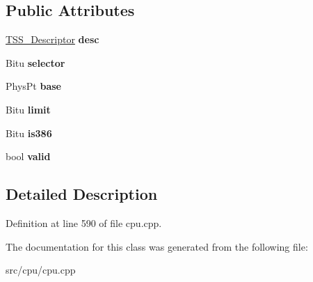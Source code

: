 \subsection*{Public Attributes}
\begin{DoxyCompactItemize}
\item 
\hypertarget{classTaskStateSegment_a46267346746acbf867d029fd39f902e3}{\hyperlink{classTSS__Descriptor}{T\-S\-S\-\_\-\-Descriptor} {\bfseries desc}}\label{classTaskStateSegment_a46267346746acbf867d029fd39f902e3}

\item 
\hypertarget{classTaskStateSegment_a0875f365d4c5477c70ed057924991bd5}{Bitu {\bfseries selector}}\label{classTaskStateSegment_a0875f365d4c5477c70ed057924991bd5}

\item 
\hypertarget{classTaskStateSegment_a95148a6c625f7821ad346627e7fe7829}{Phys\-Pt {\bfseries base}}\label{classTaskStateSegment_a95148a6c625f7821ad346627e7fe7829}

\item 
\hypertarget{classTaskStateSegment_a4dce1fe9bc4bd459bd908140219759f6}{Bitu {\bfseries limit}}\label{classTaskStateSegment_a4dce1fe9bc4bd459bd908140219759f6}

\item 
\hypertarget{classTaskStateSegment_ab002072334f2f1b417358b87e03a01e7}{Bitu {\bfseries is386}}\label{classTaskStateSegment_ab002072334f2f1b417358b87e03a01e7}

\item 
\hypertarget{classTaskStateSegment_a952e7e2635dd1b3074779a0498d74775}{bool {\bfseries valid}}\label{classTaskStateSegment_a952e7e2635dd1b3074779a0498d74775}

\end{DoxyCompactItemize}


\subsection{Detailed Description}


Definition at line 590 of file cpu.\-cpp.



The documentation for this class was generated from the following file\-:\begin{DoxyCompactItemize}
\item 
src/cpu/cpu.\-cpp\end{DoxyCompactItemize}
